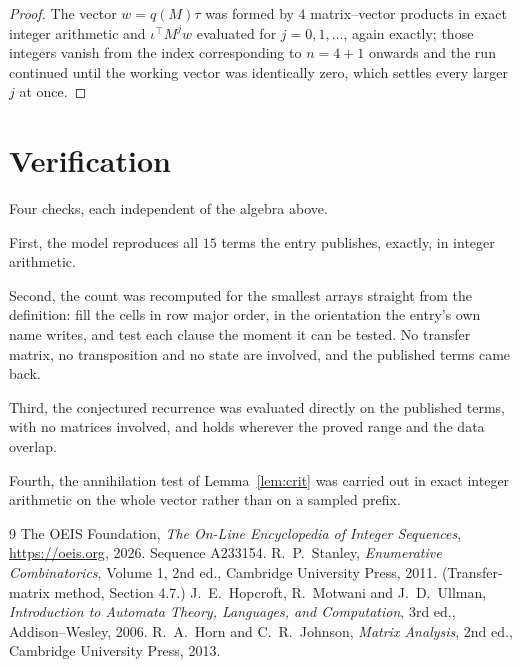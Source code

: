 \documentclass[11pt,a4paper]{article}
\theoremstyle{plain}
\theoremstyle{definition}
\begin{document}
\begin{proof}
The vector $w=q(M)\tau$ was formed by $4$ matrix--vector products in exact integer
arithmetic and $\iota^{\!\top}M^{j}w$ evaluated for $j=0,1,\dots$, again exactly; those
integers vanish from the index corresponding to $n=4+1$ onwards and the run continued
until the working vector was identically zero, which settles every larger $j$ at once.
\end{proof}

\section{Verification}

Four checks, each independent of the algebra above.

First, the model reproduces all $15$ terms the entry publishes, exactly, in integer
arithmetic.

Second, the count was recomputed for the smallest arrays straight from the definition: fill the
cells in row major order, in the orientation the entry's own name writes, and test each clause
the moment it can be tested. No transfer matrix, no transposition and no state are involved,
and the published terms came back.

Third, the conjectured recurrence was evaluated directly on the published terms, with no
matrices involved, and holds wherever the proved range and the data overlap.

Fourth, the annihilation test of Lemma~\ref{lem:crit} was carried out in exact integer
arithmetic on the whole vector rather than on a sampled prefix.

\begin{thebibliography}{9}
 The OEIS Foundation, \emph{The On-Line Encyclopedia of Integer
Sequences}, \url{https://oeis.org}, 2026. Sequence A233154.
 R.~P.~Stanley, \emph{Enumerative Combinatorics}, Volume 1, 2nd ed.,
Cambridge University Press, 2011. (Transfer-matrix method, Section 4.7.)
 J.~E.~Hopcroft, R.~Motwani and J.~D.~Ullman, \emph{Introduction to Automata
Theory, Languages, and Computation}, 3rd ed., Addison--Wesley, 2006.
 R.~A.~Horn and C.~R.~Johnson, \emph{Matrix Analysis}, 2nd ed., Cambridge
University Press, 2013.
\end{thebibliography}
\end{document}
